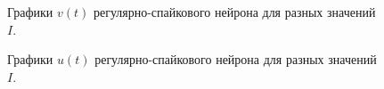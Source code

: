 \begin{figure}[h]
	\caption{Графики $v(t)$ регулярно-спайкового нейрона для разных значений $I$.}
	\label{rs_different_I_potentials}
\end{figure}

\begin{figure}[h]
	\caption{Графики $u(t)$ регулярно-спайкового нейрона для разных значений $I$.}
	\label{rs_different_I_recovery}
\end{figure}

